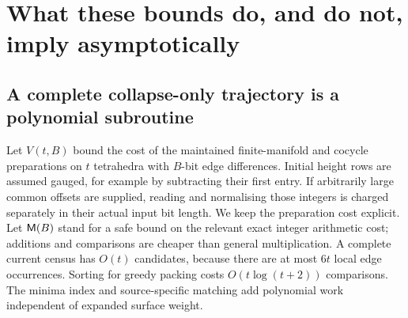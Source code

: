 \section{What these bounds do, and do not, imply asymptotically}
\label{sec:complexity}

\subsection{A complete collapse-only trajectory is a polynomial subroutine}

Let $V(t,B)$ bound the cost of the maintained finite-manifold and cocycle
preparations on $t$ tetrahedra with $B$-bit edge differences. Initial
height rows are assumed gauged, for example by subtracting their first
entry. If arbitrarily large common offsets are supplied, reading and
normalising those integers is charged separately in their actual input
bit length. We keep the preparation cost explicit. Let $\mathsf M(B)$ stand for a safe bound on the relevant exact
integer arithmetic cost; additions and comparisons are cheaper than general
multiplication. A complete current census has $O(t)$ candidates, because
there are at most $6t$ local edge occurrences. Sorting for greedy packing
costs $O(t\log(t+2))$ comparisons. The minima index and source-specific
matching add polynomial work independent of expanded surface weight.

